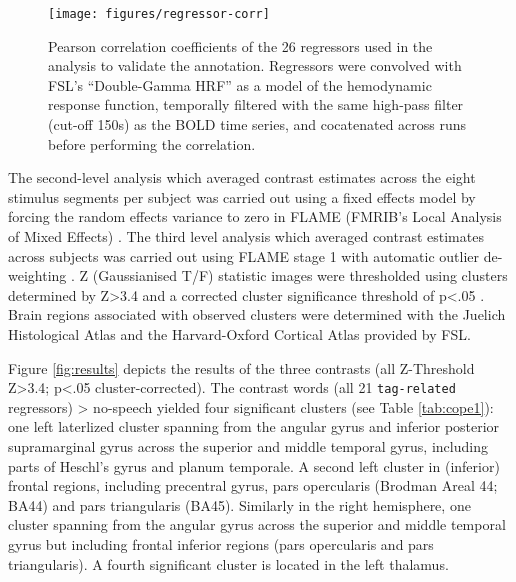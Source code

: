 \documentclass[10pt,a4paper,onecolumn]{article}
\begin{document}
\begin{figure*}
  \centering
  \texttt{[image: figures/regressor-corr]}
  \caption{Pearson correlation coefficients of the 26 regressors used in the analysis to validate the annotation.
Regressors were convolved with FSL's ``Double-Gamma HRF'' as a model of the hemodynamic response function, temporally filtered with the same high-pass filter (cut-off 150s) as the BOLD time series, and cocatenated across runs before performing the correlation.}
\label{fig:reg-corr}
\end{figure*}


The second-level analysis which averaged contrast estimates across the eight stimulus segments per subject was carried out using a fixed effects model by forcing the random effects variance to zero in FLAME (FMRIB's Local Analysis of Mixed Effects) \citep{beckmann2003general, woolrich2004multilevel}.
The third level analysis which averaged contrast estimates across subjects was carried out using FLAME stage 1 with automatic outlier de-weighting \citep{woolrich2004multilevel, woolrich2008robust}.
Z (Gaussianised T/F) statistic images were thresholded using clusters determined by Z>3.4 and a corrected cluster significance threshold of p<.05 \citep{woolrich2008robust}.
Brain regions associated with observed clusters were determined with the Juelich Histological Atlas \citep{eickhoff2005toolbox,eickhoff2007assignment} and the Harvard-Oxford Cortical Atlas \citep{desikan2006automated} provided by FSL.


Figure \ref{fig:results} depicts the results of the three contrasts (all Z-Threshold Z>3.4; p<.05 cluster-corrected).
The contrast words (all 21 \texttt{tag-related} regressors) > no-speech yielded four significant clusters (see Table \ref{tab:cope1}):
one left laterlized cluster spanning from the angular gyrus and inferior posterior supramarginal gyrus across the superior and middle temporal gyrus, including parts of Heschl's gyrus and planum temporale.
A second left cluster in (inferior) frontal regions, including precentral gyrus, pars opercularis (Brodman Areal 44; BA44) and pars triangularis (BA45).
Similarly in the right hemisphere, one cluster spanning from the angular gyrus across the superior and middle temporal gyrus but including frontal inferior regions (pars opercularis and pars triangularis).
A fourth significant cluster is located in the left thalamus.
\end{document}
